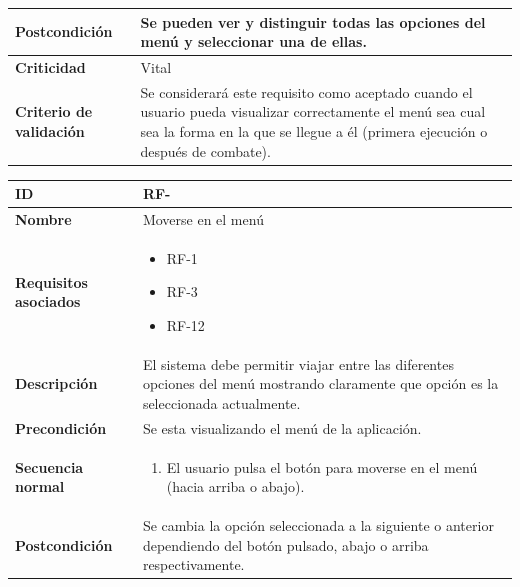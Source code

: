 \begin{center}
\begin{tabular}{ | p{4.7cm} | p{10cm} | }
		\hline
		\textbf{Postcondición} & 
		Se pueden ver y distinguir todas las opciones del menú y seleccionar una de ellas.
		\\
		
		\hline 
		\textbf{Criticidad} &
		Vital\\
		
		\hline 
		\textbf{Criterio de validación} & 
		Se considerará este requisito como aceptado cuando el usuario pueda visualizar correctamente el menú sea cual sea la forma en la que se llegue a él (primera ejecución o después de combate).\\
		
		\hline
	\end{tabular}
\end{center}

\begin{center}
	\begin{tabular}{ | p{4.7cm} | p{10cm} | } 
		\hline
		
		\textbf{ID} & RF-\arabic{contador_requisitos_funcionales}
		{contador_requisitos_funcionales} \\
		
		\hline 
		\textbf{Nombre} &
		Moverse en el menú\\ 
		
		\hline
		\textbf{Requisitos asociados} & 
		\begin{itemize}
			\item RF-1
			\item RF-3
			\item RF-12
		\end{itemize}\\
		
		\hline
		\textbf{Descripción} & 
		El sistema debe permitir viajar entre las diferentes opciones del menú mostrando claramente que opción es la seleccionada actualmente.\\
		
		\hline
		\textbf{Precondición} & 
		Se esta visualizando el menú de la aplicación.\\
		
		\hline
		\textbf{Secuencia normal} &
		 \begin{enumerate}
		 	\item El usuario pulsa el botón para moverse en el menú (hacia arriba o abajo).
		 \end{enumerate}
		\\
		
		\hline
		\textbf{Postcondición} & 
		Se cambia la opción seleccionada a la siguiente o anterior dependiendo del botón pulsado, abajo o arriba respectivamente.
		\\
		

\end{tabular}
\end{center}
